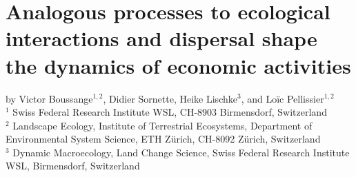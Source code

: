 \newcommand{\modnull}{\M_{null}}
\newcommand{\modalphap}{\M_{\alpha^+}}
\newcommand{\modalphan}{\M_{\alpha^-}}
\newcommand{\modmu}{\M_\mu}
\newcommand{\moddelta}{\M_\delta}
\newcommand{\hc}{^{(c)}}
\newcommand{\LL}{\mathcal{L}}
\newcommand{\BIC}{\text{BIC}}

\graphicspath{{./content/chap4_econobiology/figures/}}

\chapter{Analogous processes to ecological interactions and dispersal shape the dynamics of economic activities}
\label{chap:econobiology}

by Victor Boussange$^{1,2}$,
Didier Sornette,
Heike Lischke$^{3}$,
and 
Loïc Pellissier$^{1,2}$\bigskip
\\
$^1$ \small{Swiss Federal Research Institute WSL, CH-8903 Birmensdorf, Switzerland}\smallskip\\
$^2$ \small{Landscape Ecology, Institute of Terrestrial Ecosystems, Department of Environmental System Science, ETH Zürich, CH-8092 Zürich, Switzerland}\smallskip\\
$^3$ \small{Dynamic Macroecology, Land Change Science, Swiss Federal Research Institute WSL, Birmensdorf, Switzerland}\smallskip

